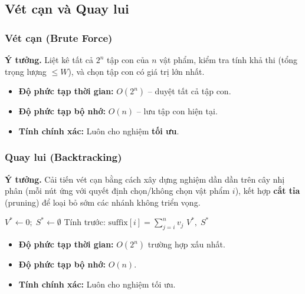 \subsection{Vét cạn và Quay lui}

\subsubsection*{Vét cạn (Brute Force)}

\textbf{Ý tưởng.} Liệt kê tất cả $2^n$ tập con của $n$ vật phẩm, kiểm tra tính khả thi (tổng trọng lượng $\leq W$), và chọn tập con có giá trị lớn nhất.

\begin{itemize}[noitemsep]
    \item \textbf{Độ phức tạp thời gian:} $O(2^n)$ -- duyệt tất cả tập con.
    \item \textbf{Độ phức tạp bộ nhớ:} $O(n)$ -- lưu tập con hiện tại.
    \item \textbf{Tính chính xác:} Luôn cho nghiệm \textbf{tối ưu}.
\end{itemize}

\subsubsection*{Quay lui (Backtracking)}

\textbf{Ý tưởng.} Cải tiến vét cạn bằng cách xây dựng nghiệm dần dần trên cây nhị phân (mỗi nút ứng với quyết định chọn/không chọn vật phẩm $i$), kết hợp \textbf{cắt tỉa} (pruning) để loại bỏ sớm các nhánh không triển vọng.

\begin{algorithm}[H]
\caption{Quay lui cho 0/1 Knapsack}
\label{alg:backtracking}
$V^* \leftarrow 0;\; S^* \leftarrow \emptyset$\;
Tính trước: $\text{suffix}[i] = \sum_{j=i}^{n} v_j$\;
\;
\Return $V^*,\; S^*$\;
\end{algorithm}

\begin{itemize}[noitemsep]
    \item \textbf{Độ phức tạp thời gian:} $O(2^n)$ trường hợp xấu nhất.
    \item \textbf{Độ phức tạp bộ nhớ:} $O(n)$.
    \item \textbf{Tính chính xác:} Luôn cho nghiệm tối ưu.
\end{itemize}

